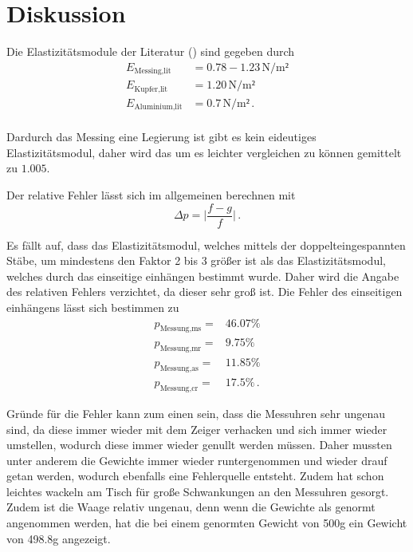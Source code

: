 \newpage
\section{Diskussion}
\label{sec:Diskussion}

Die Elastizitätsmodule der Literatur (\cite{Elastizitätsmodul}) sind gegeben durch
\begin{align*}
     E_\text{Messing,lit} &= 0.78 - 1.23  \, \si{\newton\per\meter²}\\
     E_\text{Kupfer,lit} &= 1.20 \, \si{\newton\per\meter²}\\
     E_\text{Aluminium,lit} &= 0.7 \, \si{\newton\per\meter²} \, . \\
\end{align*} 

Dardurch das Messing eine Legierung ist gibt es kein eideutiges Elastizitätsmodul, daher wird das um es leichter vergleichen zu können gemittelt zu $1.005$.

\noindent
Der relative Fehler lässt sich im allgemeinen berechnen mit 
\begin{equation*}
    \Delta p = \bigg |\frac{f-g}{f} \bigg | \, .
\end{equation*}

Es fällt auf, dass das Elastizitätsmodul, welches mittels der doppelteingespannten Stäbe, um mindestens den Faktor 2 bis 3 größer ist als das Elastizitätsmodul, welches
durch das einseitige einhängen bestimmt wurde. Daher wird die Angabe des relativen Fehlers verzichtet, da dieser sehr groß ist.
Die Fehler des einseitigen einhängens lässt sich bestimmen zu
\begin{align*}
    p_\text{Messung,ms} =& 46.07 \si{\percent}   \\
    p_\text{Messung,mr} =& 9.75 \si{\percent}  \\
    p_\text{Messung,as} =& 11.85 \si{\percent}\\
    p_\text{Messung,cr} =& 17.5 \si{\percent} \, .
\end{align*}

\noindent
Gründe für die Fehler kann zum einen sein, dass die Messuhren sehr ungenau sind, da diese immer wieder mit dem Zeiger verhacken und sich immer wieder umstellen, wodurch 
diese immer wieder genullt werden müssen. Daher mussten unter anderem die Gewichte immer wieder runtergenommen und wieder drauf getan werden, wodurch ebenfalls eine Fehlerquelle
entsteht.  Zudem hat schon leichtes wackeln am Tisch für große Schwankungen an den Messuhren gesorgt.
Zudem ist die Waage relativ ungenau, denn wenn die Gewichte als genormt angenommen werden, hat die bei einem genormten Gewicht von 500g ein Gewicht von 498.8g angezeigt. 

